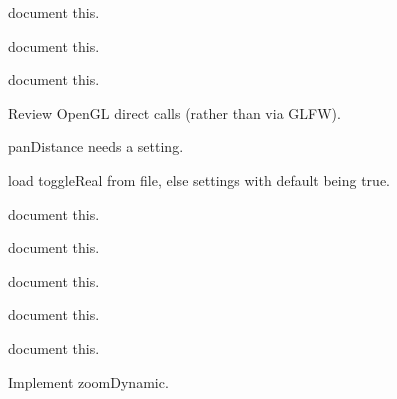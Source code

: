 \begin{DoxyRefList}
%
document this.  
\item[Member \mbox{\hyperlink{imgui__main_8c_a55e5254de2bc5047d00a331596fc1956}{update\+All\+View\+Select\+Box\+Colors}} (unsigned int colorL, unsigned int fillL, unsigned int colorR, unsigned int fillR, int alpha)]\label{todo__todo000169}%
%
document this.  
\item[Member \mbox{\hyperlink{imgui__main_8c_ad5c889067073aed7231513e6d906cda7}{vertical\+\_\+dimension\+\_\+action}} (void)]\label{todo__todo000191}%
%
document this.  
\item[Member \mbox{\hyperlink{imgui__main_8c_a1d7dbd1773573f522eac182c4799ba8b}{View\+\_\+\+\_\+}} (void)]\label{todo__todo000034}%
%
Review Open\+GL direct calls (rather than via GLFW).

\label{todo__todo000035}%
%
pan\+Distance needs a setting.

\label{todo__todo000036}%
%
load toggle\+Real from file, else settings with default being true.  
\item[Member \mbox{\hyperlink{imgui__main_8c_ac8174d1035b7381b8a5940cdb1053b9b}{view\+\_\+empty\+\_\+double\+\_\+click}} (void)]\label{todo__todo000011}%
%
document this.  
\item[Member \mbox{\hyperlink{imgui__main_8c_a0871cb7dd9cb4de8391b002438003347}{view\+\_\+empty\+\_\+paint\+\_\+event}} (\mbox{\hyperlink{class_view}{View}} $\ast$view, int $\ast$event)]\label{todo__todo000012}%
%
document this.  
\item[Member \mbox{\hyperlink{imgui__main_8c_ab1f89ec04ac60db83ea678ac3c73bbb4}{vulcanize\+\_\+action}} (void)]\label{todo__todo000186}%
%
document this.  
\item[Member \mbox{\hyperlink{imgui__main_8c_ac8198c84e013c6fff241113b05e52c62}{whats\+\_\+this\+\_\+context\+\_\+help\+\_\+action}} (void)]\label{todo__todo000165}%
%
document this.  
\item[Member \mbox{\hyperlink{imgui__main_8c_a0780df1393f84c56ce0163f7da1320f0}{window\+\_\+menu\+\_\+about\+\_\+to\+\_\+show}} (void)]\label{todo__todo000200}%
%
document this.  
\item[Member \mbox{\hyperlink{imgui__main_8c_a9d77efa715f7141c72b9cc864fccab50}{zoom\+\_\+action}} (const char $\ast$arg)]\label{todo__todo000120}%
%
Implement zoom\+Dynamic. 


\end{DoxyRefList}
